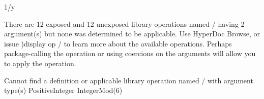 {{{{{{{{\begin{xtc}
\begin{spadsrc}
1/y 
\end{spadsrc}
\begin{MessageOutput}
   There are 12 exposed and 12 unexposed library operations named / 
      having 2 argument(s) but none was determined to be applicable. 
      Use HyperDoc Browse, or issue
                                )display op /
      to learn more about the available operations. Perhaps 
      package-calling the operation or using coercions on the arguments
      will allow you to apply the operation.
\end{MessageOutput}
\begin{MessageOutput}
   Cannot find a definition or applicable library operation named / 
      with argument type(s) 
                               PositiveInteger
                                IntegerMod(6)
      

\end{MessageOutput}
\end{xtc}}}}}}}}}
